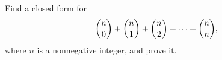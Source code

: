 Find a closed form for
\[\dbinom n0+\dbinom n1+\dbinom n2+\cdots+\dbinom nn,\]
where $n$ is a nonnegative integer, and prove it.
